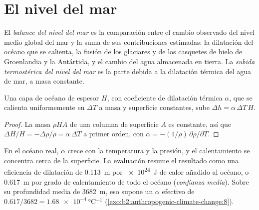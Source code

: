 \section{El nivel del mar}\label{sec:b2:anthropogenic-climate-change:sea-level}

\begin{definition}\label{def:b2:anthropogenic-climate-change:sea-level}
El \emph{balance del nivel del mar} es la comparación entre el cambio observado del
nivel medio global del mar y la suma de sus contribuciones estimadas: la dilatación del océano que se
calienta, la fusión de los glaciares y de los casquetes de hielo de Groenlandia y la Antártida, y el cambio del
agua almacenada en tierra. La \emph{subida termostérica del nivel del mar} es la
parte debida a la dilatación térmica del agua de mar, a masa constante.
\end{definition}

\begin{proposition}\label{prop:b2:anthropogenic-climate-change:thermosteric}
Una capa de océano de espesor $H$, con coeficiente de dilatación térmica $\alpha$, que se calienta uniformemente
en $\Delta T$ a masa y superficie constantes, sube $\Delta h = \alpha\,\Delta T\,H$.
\end{proposition}
\begin{proof}
La masa $\rho H A$ de una columna de superficie $A$ es constante, así que $\Delta H/H = -\Delta\rho/\rho =
\alpha\,\Delta T$ a primer orden, con $\alpha = -(1/\rho)\,\partial\rho/\partial T$.
\end{proof}

En el océano real, $\alpha$ crece con la temperatura y la presión, y el calentamiento se concentra cerca de
la superficie. La evaluación resume el resultado como una eficiencia de dilatación de \qty{0.113}{m} por
\qty{e24}{J} de calor añadido al océano, o \qty{0.617}{m} por grado de calentamiento de todo el océano
(\emph{confianza media}). Sobre su profundidad media de \qty{3682}{m}, eso supone un $\alpha$ efectivo de
$0.617/3682 = \qty{1.68e-4}{\celsius^{-1}}$ (\cref{exo:b2:anthropogenic-climate-change:8}).

